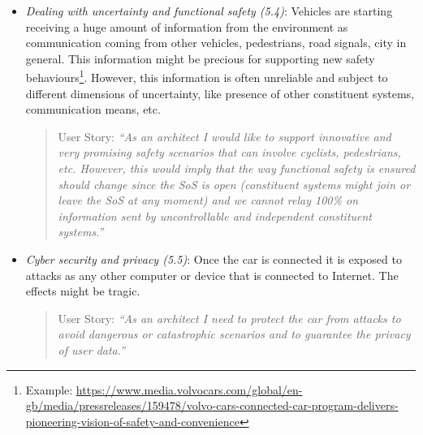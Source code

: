 \begin{itemize}
\begin{itemize}
\begin{quote}
{User Story:} 
\emph{``As an architect I need to manage the transition towards autonomous behaviours of the car that are needed to achieve the goal of the SoS. The car should be engineered so to, often immediately, switch to another mode and perform the actions required by the SoS. The right tradeoff between independence of the vehicle (from the SoS) and service offered to the SoS needs to be found.''}
\end{quote}

\item {\em Dealing with uncertainty and functional safety (5.4)}: Vehicles are starting receiving a huge amount of information from the environment as communication coming from other vehicles, pedestrians, road signals, city in general. This information might be precious for supporting new safety behaviours\footnote{Example: \url{https://www.media.volvocars.com/global/en-gb/media/pressreleases/159478/volvo-cars-connected-car-program-delivers-pioneering-vision-of-safety-and-convenience}}. However, this information is often unreliable and subject to different dimensions of uncertainty, like presence of other constituent systems, communication means, etc.

\begin{quote}
{User Story:} 
\emph{``As an architect I would like to support innovative and very promising safety scenarios that can involve cyclists, pedestrians, etc. However, this would imply that the way functional safety is ensured should change since the SoS is open (constituent systems might join or leave the SoS at any moment) and we cannot relay 100\% on information sent by uncontrollable and independent constituent systems.''}
\end{quote}


\item {\em Cyber security and privacy (5.5)}: Once the car is connected it is exposed to attacks as any other computer or device that is connected to Internet. The effects might be tragic.

\begin{quote}
{User Story:} 
\emph{``As an architect I need to protect the car from attacks to avoid dangerous or catastrophic scenarios and to guarantee the privacy of user data.''}
\end{quote}


\end{itemize}



\end{itemize}
